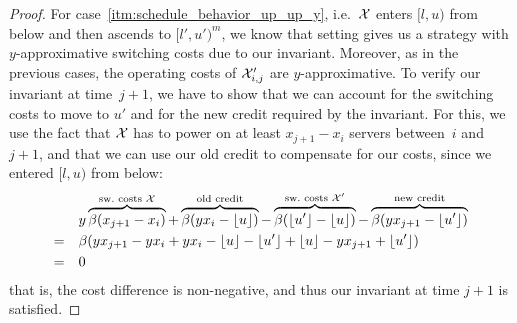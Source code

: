 \begin{proof}
For case~\ref{itm:schedule_behavior_up_up_y}, i.e.\ $\mathcal{X}$ enters $[l,u)$ from below and then ascends to $[l',u')^m$, we know that setting  gives us a strategy with $y$-approximative switching costs due to our invariant. Moreover, as in the previous cases, the operating costs of $\mathcal{X}_{i,j}'$ are $y$-approximative. 
To verify our invariant at time~$j+1$, we have to show that we can account for the switching costs to move to $u'$ and for the new credit required by the invariant. For this, we use the fact that $\mathcal{X}$ has to power on at least $x_{j+1}-x_i$ servers between~$i$ and~$j+1$, and that we can use our old credit to compensate for our costs, since we entered $[l,u)$ from below:
\begin{align*}
	&y\overbrace{\beta(x_{j+1}-x_i)}^{\text{sw.\ costs }\mathcal{X}}+\overbrace{\beta(yx_i-\lfloor u\rfloor)}^{\text{old credit}}-\overbrace{\beta(\lfloor u'\rfloor-\lfloor u\rfloor)}^{\text{sw.\ costs }\mathcal{X}'}-\overbrace{\beta(yx_{j+1}-\lfloor u'\rfloor)}^{\text{new credit}}\\
	=\quad&\beta(yx_{j+1}-yx_i+yx_i-\lfloor u\rfloor-\lfloor u'\rfloor+\lfloor u\rfloor-yx_{j+1}+\lfloor u'\rfloor)\\
	=\quad&0
\end{align*}
that is, the cost difference is non-negative, and thus our invariant at time $j+1$ is satisfied.
	

\end{proof}

